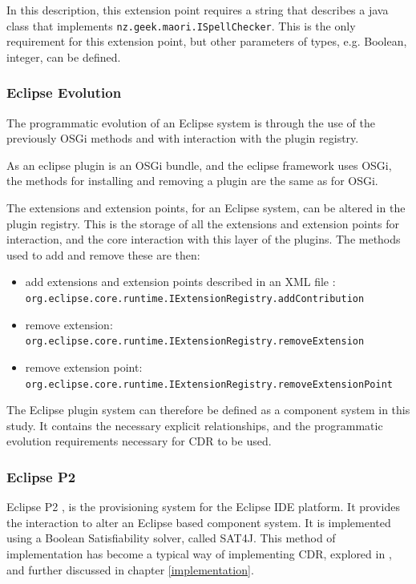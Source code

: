 In this description, this extension point requires a string that describes a java class that implements \verb+nz.geek.maori.ISpellChecker+.
This is the only requirement for this extension point, but other parameters of types, e.g. Boolean, integer, can be defined.

\subsubsection{Eclipse Evolution}
The programmatic evolution of an Eclipse system is through the use of the previously OSGi methods and with interaction with the plugin registry.

As an eclipse plugin is an OSGi bundle, and the eclipse framework uses OSGi, the methods for installing and removing a plugin are the same as for OSGi.

The extensions and extension points, for an Eclipse system, can be altered in the plugin registry.
This is the storage of all the extensions and extension points for interaction, and the core interaction with this layer of the plugins.
The methods used to add and remove these are then:

\begin{itemize}
  \item add extensions and extension points described in an XML file : \verb+org.eclipse.core.runtime.IExtensionRegistry.addContribution+
  \item remove extension: \verb+org.eclipse.core.runtime.IExtensionRegistry.removeExtension+
  \item remove extension point: \verb+org.eclipse.core.runtime.IExtensionRegistry.removeExtensionPoint+
\end{itemize}

The Eclipse plugin system can therefore be defined as a component system in this study.
It contains the necessary explicit relationships, and the programmatic evolution requirements necessary for CDR to be used.

\subsubsection{Eclipse P2}
Eclipse P2 \cite{le_berre_dependency_2009}, \cite{leBerre2010} is the provisioning system for the Eclipse IDE platform.
It provides the interaction to alter an Eclipse based component system. 
It is implemented using a Boolean Satisfiability solver, called SAT4J.
This method of implementation has become a typical way of implementing CDR, explored in \cite{Berre2008}, and further discussed in chapter \ref{implementation}.

